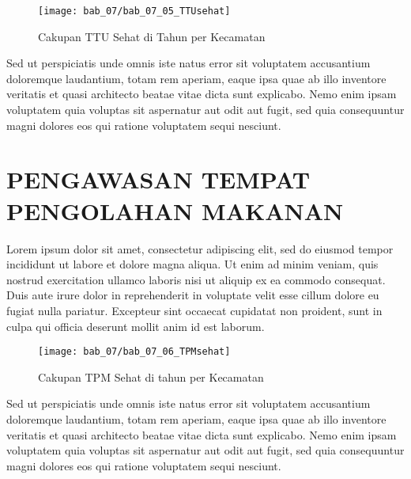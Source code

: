\begin{figure}[H]
    \centering
    \label{fig:Cakupan-TTU-Sehat}
    \texttt{[image: bab\_07/bab\_07\_05\_TTUsehat]}
    \caption{Cakupan TTU Sehat di \namaKabupaten Tahun \tP per Kecamatan}
\end{figure}

Sed ut perspiciatis unde omnis iste natus error sit voluptatem accusantium doloremque laudantium, totam rem aperiam, eaque ipsa quae ab illo inventore veritatis et quasi architecto beatae vitae dicta sunt explicabo. Nemo enim ipsam voluptatem quia voluptas sit aspernatur aut odit aut fugit, sed quia consequuntur magni dolores eos qui ratione voluptatem sequi nesciunt.

\section{PENGAWASAN TEMPAT PENGOLAHAN MAKANAN}
Lorem ipsum dolor sit amet, consectetur adipiscing elit, sed do eiusmod tempor incididunt ut labore et dolore magna aliqua. Ut enim ad minim veniam, quis nostrud exercitation ullamco laboris nisi ut aliquip ex ea commodo consequat. Duis aute irure dolor in reprehenderit in voluptate velit esse cillum dolore eu fugiat nulla pariatur. Excepteur sint occaecat cupidatat non proident, sunt in culpa qui officia deserunt mollit anim id est laborum.

\begin{figure}[H]
    \centering
    \label{fig:Cakupan-TTM-Sehat}
    \texttt{[image: bab\_07/bab\_07\_06\_TPMsehat]}
    \caption{Cakupan TPM Sehat di \namaKabupaten tahun \tP per Kecamatan}
\end{figure}

Sed ut perspiciatis unde omnis iste natus error sit voluptatem accusantium doloremque laudantium, totam rem aperiam, eaque ipsa quae ab illo inventore veritatis et quasi architecto beatae vitae dicta sunt explicabo. Nemo enim ipsam voluptatem quia voluptas sit aspernatur aut odit aut fugit, sed quia consequuntur magni dolores eos qui ratione voluptatem sequi nesciunt.

